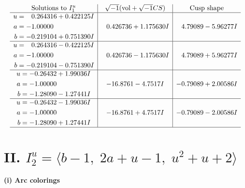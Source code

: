 \documentclass[1p]{elsarticle_modified}
\theoremstyle{definition}
\newcommand{\I}{\sqrt{-1}}
\begin{document}
$$\begin{array}{c|c|c}  
\text{Solutions to }I^u_{1}& \I (\text{vol} + \sqrt{-1}CS) & \text{Cusp shape}\\
 \hline 
\begin{aligned}
u &= \phantom{-}0.264316 + 0.422125 I \\
a &= -1.00000\phantom{ +0.000000I} \\
b &= -0.219104 + 0.751390 I\end{aligned}
 & \phantom{-}0.426736 + 1.175630 I & \phantom{-}4.79089 - 5.96277 I \\ \hline\begin{aligned}
u &= \phantom{-}0.264316 - 0.422125 I \\
a &= -1.00000\phantom{ +0.000000I} \\
b &= -0.219104 - 0.751390 I\end{aligned}
 & \phantom{-}0.426736 - 1.175630 I & \phantom{-}4.79089 + 5.96277 I \\ \hline\begin{aligned}
u &= -0.26432 + 1.99036 I \\
a &= -1.00000\phantom{ +0.000000I} \\
b &= -1.28090 - 1.27441 I\end{aligned}
 & -16.8761 - 4.7517 I & -0.79089 + 2.00586 I \\ \hline\begin{aligned}
u &= -0.26432 - 1.99036 I \\
a &= -1.00000\phantom{ +0.000000I} \\
b &= -1.28090 + 1.27441 I\end{aligned}
 & -16.8761 + 4.7517 I & -0.79089 - 2.00586 I\\
 \hline 
 \end{array}$$\newpage\newpage\renewcommand{\arraystretch}{1}
\centering \section*{II. $I^u_{2}= \langle b-1,\;2 a+u-1,\;u^2+u+2 \rangle$}
\flushleft \textbf{(i) Arc colorings}\\
\end{document}
